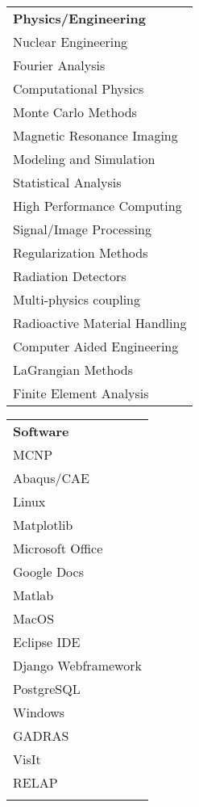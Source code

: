 
\begin{minipage}{0.32\textwidth}
\begin{tabular}{l}
	{\large\textbf{Physics/Engineering}} \\
	\highskillbw Nuclear Engineering \\
	\highskillbw Fourier Analysis \\ 
	\highskillbw Computational Physics \\
	\highskillbw Monte Carlo Methods \\
	\highskillbw Magnetic Resonance Imaging \\ 
	\highskillbw Modeling and Simulation \\
	\medskillbw Statistical Analysis \\
	\medskillbw High Performance Computing \\
	\medskillbw Signal/Image Processing \\
	\medskillbw Regularization Methods  \\
	\medskillbw Radiation Detectors \\
	\medskillbw Multi-physics coupling \\
	\medskillbw Radioactive Material Handling \\
	\lowskillbw Computer Aided Engineering \\
	\lowskillbw LaGrangian Methods \\
	\lowskillbw Finite Element Analysis \\
\end{tabular}
\end{minipage}%
\begin{minipage}{0.2\textwidth}
	\begin{center}
\begin{tabular}{l}
	{\large\textbf{Software}} \\
	\highskillbw \textsc{MCNP} \\
	\highskillbw Abaqus/CAE \\
	\highskillbw Linux \\ 
	\highskillbw Matplotlib \\ 
	\highskillbw Microsoft Office \\
	\highskillbw Google Docs \\
	\highskillbw Matlab \\
	\highskillbw MacOS \\
	\medskillbw Eclipse IDE \\
	\medskillbw Django Webframework \\
	\medskillbw PostgreSQL \\
	\medskillbw Windows \\
	\lowskillbw GADRAS \\
	\lowskillbw VisIt \\
	\lowskillbw RELAP \\
	\\
\end{tabular}
	\end{center}
\end{minipage}%
